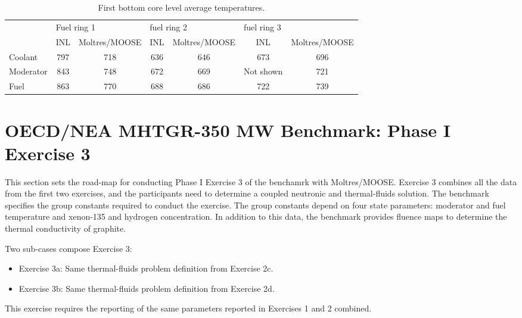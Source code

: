 \begin{table}[htbp!]
\centering
      \caption{First bottom core level average temperatures.}
      \label{tab:th-ex2a-results}
\begin{tabular}{l|c|c|c|c|c|c}
    \toprule
          & \multicolumn{2}{l|}{Fuel ring 1} & \multicolumn{2}{l|}{fuel ring 2} & \multicolumn{2}{l}{fuel ring 3} \\ \cline{2-7} 
          & INL     & Moltres/MOOSE     & INL     & Moltres/MOOSE     & INL       & Moltres/MOOSE \\
    \midrule
Coolant   & 797     & 718               & 636     & 646               & 673       & 696           \\
Moderator & 843     & 748               & 672     & 669               & Not shown & 721           \\
Fuel      & 863     & 770               & 688     & 686               & 722       & 739           \\
    \bottomrule
  \end{tabular}
\end{table}

\section{OECD/NEA MHTGR-350 MW Benchmark: Phase I Exercise 3}

This section sets the road-map for conducting Phase I Exercise 3 of the benchamrk with Moltres/MOOSE.
Exercise 3 combines all the data from the first two exercises, and the participants need to determine a coupled neutronic and thermal-fluids solution.
The benchmark specifies the group constants required to conduct the exercise.
The group constants depend on four state parameters: moderator and fuel temperature and xenon-135 and hydrogen concentration.
In addition to this data, the benchmark provides fluence maps to determine the thermal conductivity of graphite.

Two sub-cases compose Exercise 3:
\begin{itemize}
  \item Exercise 3a: Same thermal-fluids problem definition from Exercise 2c.
  \item Exercise 3b: Same thermal-fluids problem definition from Exercise 2d.
\end{itemize}

This exercise requires the reporting of the same parameters reported in Exercises 1 and 2 combined.

